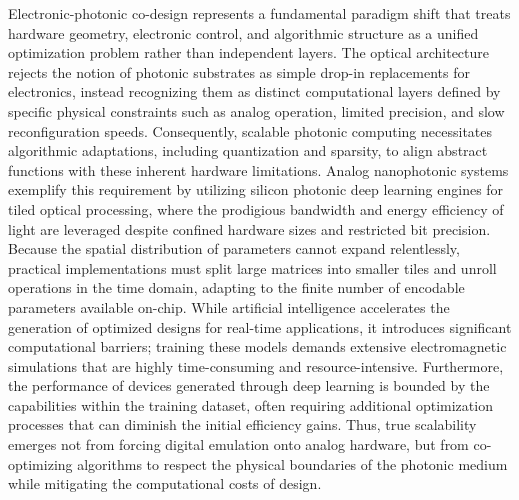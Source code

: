 Electronic-photonic co-design represents a fundamental paradigm shift that treats hardware geometry, electronic control, and algorithmic structure as a unified optimization problem rather than independent layers. \citep{doi_10_48550_arxiv_2410_01289_34dceec6} \citep{doi_10_1145_3658617_3697771_aa4ee9ae} The optical architecture rejects the notion of photonic substrates as simple drop-in replacements for electronics, instead recognizing them as distinct computational layers defined by specific physical constraints such as analog operation, limited precision, and slow reconfiguration speeds. Consequently, scalable photonic computing necessitates algorithmic adaptations, including quantization and sparsity, to align abstract functions with these inherent hardware limitations. Analog nanophotonic systems exemplify this requirement by utilizing silicon photonic deep learning engines for tiled optical processing, where the prodigious bandwidth and energy efficiency of light are leveraged despite confined hardware sizes and restricted bit precision. Because the spatial distribution of parameters cannot expand relentlessly, practical implementations must split large matrices into smaller tiles and unroll operations in the time domain, adapting to the finite number of encodable parameters available on-chip. While artificial intelligence accelerates the generation of optimized designs for real-time applications, it introduces significant computational barriers; training these models demands extensive electromagnetic simulations that are highly time-consuming and resource-intensive. Furthermore, the performance of devices generated through deep learning is bounded by the capabilities within the training dataset, often requiring additional optimization processes that can diminish the initial efficiency gains. Thus, true scalability emerges not from forcing digital emulation onto analog hardware, but from co-optimizing algorithms to respect the physical boundaries of the photonic medium while mitigating the computational costs of design. \citep{doi_10_1515_nanoph_2024_0536_4b6631ba} \citep{doi_10_1515_nanoph_2022_0423_38a2c3ec}


